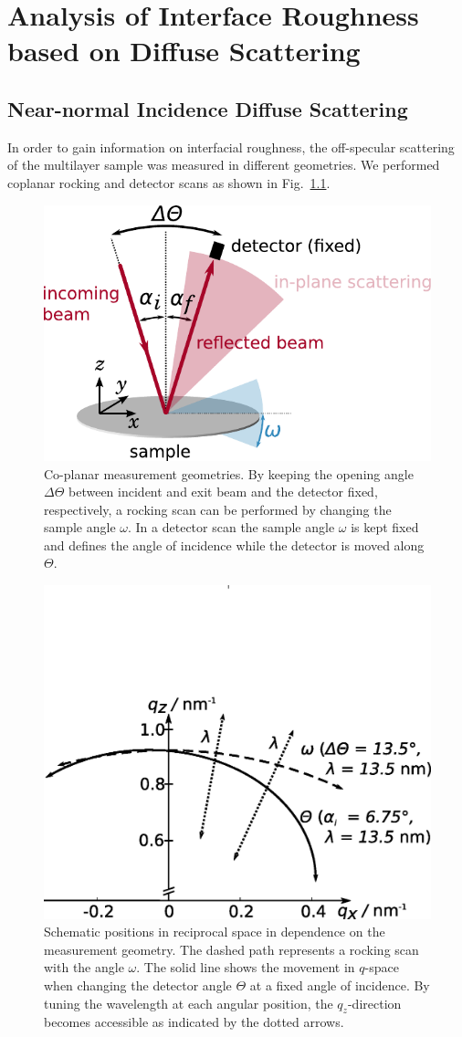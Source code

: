 \chapter{Analysis of Interface Roughness based on Diffuse Scattering} \label{ch_diff}


\section{Near-normal Incidence Diffuse Scattering}
In order to gain information on interfacial roughness, the off-specular scattering of the multilayer sample was measured in different geometries. We performed coplanar rocking and detector scans as shown in Fig.~\ref{fig:measurementGeometry}.
\begin{figure}[htbp]
	\includegraphics[width=0.7
	\textwidth]{images/Streugeometrie} \caption{Co-planar measurement geometries. By keeping the opening angle $\Delta\Theta$ between incident and exit beam and the detector fixed, respectively, a rocking scan can be performed by changing the sample angle $\omega$. In a detector scan the sample angle $\omega$ is kept fixed and defines the angle of incidence while the detector is moved along $\Theta$.} \label{fig:measurementGeometry} 
\end{figure}
\begin{figure}[htbp]
	\includegraphics[width=0.7
	\textwidth]{images/Qspace_paths} \caption{Schematic positions in reciprocal space in dependence on the measurement geometry. The dashed path represents a rocking scan with the angle $\omega$. The solid line shows the movement in $q$-space when changing the detector angle $\Theta$ at a fixed angle of incidence. By tuning the wavelength at each angular position, the $q_z$-direction becomes accessible as indicated by the dotted arrows.} \label{fig:pathsInQ} 
\end{figure}
